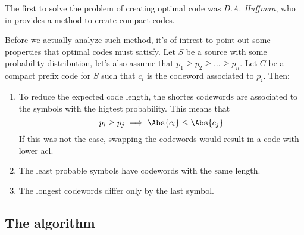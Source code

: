 \documentclass{subfiles}
\begin{document}
    The first to solve the problem of creating optimal code was \emph{D.A. Huffman},
       who in \cite{Huffman} provides a method to create compact codes.

        Before we actually analyze such method, 
            it's of intrest to point out some properties that optimal codes 
            must satisfy.
        Let \(S\) be a source with some probability distribution,
        let's also assume that \(p_{1} \ge p_{2} \ge \ldots \ge p_{n}\).
        Let \(C\) be a compact prefix code for \(S\) such that \(c_{i}\) is 
            the codeword associated to \(p_{i}\). Then:
        \begin{enumerate}
            \item To reduce the expected code length, 
                the shortes codewords are associated to the symbols with the higtest
                probability. This means that 
                \[
                   p_{i} \ge p_{j} \implies \Abs{c_{i}} \le \Abs{c_{j}}
                \]
                If this was not the case, 
                swapping the codewords would result in a code with lower \gls{acl}.

            \item The least probable symbols have codewords with the same length.
            \item The longest codewords differ only by the last symbol.
        \end{enumerate}

        \subsection{The algorithm}
        
\end{document}
